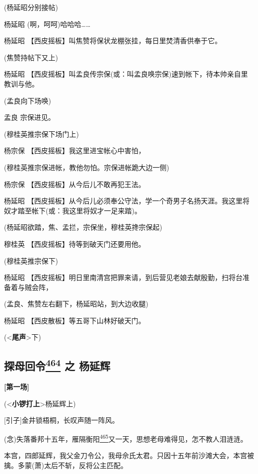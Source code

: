 (杨延昭分别接帖)

杨延昭 (啊，呵呵)哈哈哈\ldots{}\ldots{}

杨延昭 【西皮摇板】叫焦赞将保状龙棚张挂，每日里焚清香供奉于它。

(焦赞持帖下又上)

杨延昭
【西皮摇板】叫孟良传宗保(或：叫孟良唤宗保)速到帐下，待本帅亲自里教训与他。

(孟良向下场唤)

孟良 宗保进见。

(穆桂英推宗保下场门上)

杨宗保 【西皮摇板】我这里进宝帐心中害怕，

(穆桂英推宗保进帐，教他勿怕。宗保进帐跪大边一侧)

杨宗保 【西皮摇板】从今后儿不敢再犯王法。

杨延昭
【西皮摇板】从今后儿必须奉公守法，学一个奇男子名扬天涯。我这里将奴才踏至帐下(或：我这里将奴才一足来踏)。

(杨延昭欲踏，焦、孟拦，宗保坐，穆桂英搀宗保起)

穆桂英 【西皮摇板】待等到破天门还要用他。

(穆桂英推宗保下)

杨延昭
【西皮摇板】明日里南清宫把罪来请，到后营见老娘去献殷勤，扫将台准备着与贼会阵，

(孟良、焦赞左右翻下，杨延昭站，到大边收腿)

杨延昭 【西皮散板】等五哥下山林好破天门。

(\textless{}\textbf{尾声}\textgreater{}下)

\newpage
\hypertarget{ux63a2ux6bcdux56deux4ee4-ux4e4b-ux6768ux5ef6ux8f89}{%
\subsection{\texorpdfstring{探母回令\protect\hyperlink{fn464}{\textsuperscript{464}}
之
杨延辉}{探母回令464 之 杨延辉}}\label{ux63a2ux6bcdux56deux4ee4-ux4e4b-ux6768ux5ef6ux8f89}}

\textbf{{[}第一场{]}}

(\textless{}\textbf{小锣打上}\textgreater{}杨延辉上)

{[}引子{]}金井锁梧桐，长叹声随一阵风。

(念)失落番邦十五年，雁隔衡阳\protect\hyperlink{fn465}{\textsuperscript{465}}又一天，思想老母难得见，怎不教人泪涟涟。

本宫，四郎延辉，我父金刀令公，我母佘氏太君。只因十五年前沙滩大会，本宫被擒。多蒙(萧)太后不斩，反将公主匹配。

